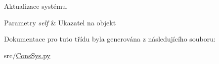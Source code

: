 Aktualizace systému. 


\begin{DoxyParams}{Parametry}
{\em self} & Ukazatel na objekt \\
\hline
\end{DoxyParams}


Dokumentace pro tuto třídu byla generována z následujícího souboru\-:\begin{DoxyCompactItemize}
\item 
src/\hyperlink{ConsSys_8py}{Cons\-Sys.\-py}\end{DoxyCompactItemize}
